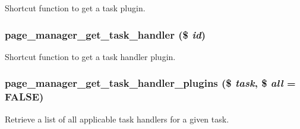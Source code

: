 \label{page__manager_8module_a402f17e89478e21a1d0f4b128996e764}
Shortcut function to get a task plugin. \hypertarget{page__manager_8module_a96c2796ab331b1eb6e052f468b4e7e11}{
\subsubsection[{page\_\-manager\_\-get\_\-task\_\-handler}]{\setlength{\rightskip}{0pt plus 5cm}page\_\-manager\_\-get\_\-task\_\-handler (\$ {\em id})}}
\label{page__manager_8module_a96c2796ab331b1eb6e052f468b4e7e11}
Shortcut function to get a task handler plugin. \hypertarget{page__manager_8module_a42b594f0f28dce3778bec96316a58678}{
\subsubsection[{page\_\-manager\_\-get\_\-task\_\-handler\_\-plugins}]{\setlength{\rightskip}{0pt plus 5cm}page\_\-manager\_\-get\_\-task\_\-handler\_\-plugins (\$ {\em task}, \/  \$ {\em all} = {\ttfamily FALSE})}}
\label{page__manager_8module_a42b594f0f28dce3778bec96316a58678}
Retrieve a list of all applicable task handlers for a given task.


